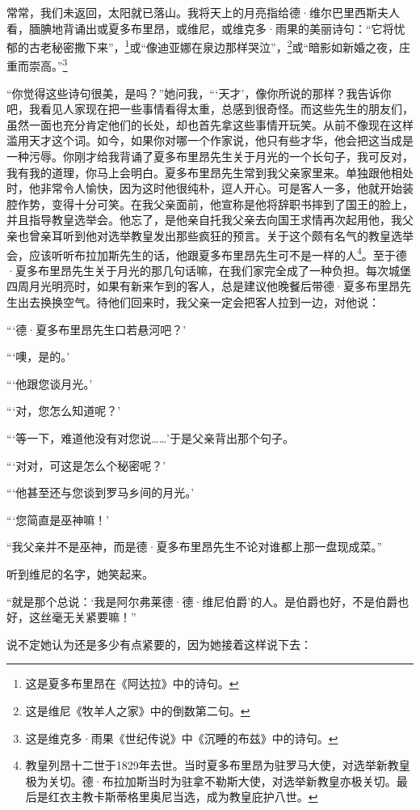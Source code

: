 \par 常常，我们未返回，太阳就已落山。我将天上的月亮指给德·维尔巴里西斯夫人看，腼腆地背诵出或夏多布里昂，或维尼，或维克多·雨果的美丽诗句：“它将忧郁的古老秘密撒下来”，\footnote{这是夏多布里昂在《阿达拉》中的诗句。}或“像迪亚娜在泉边那样哭泣”，\footnote{这是维尼《牧羊人之家》中的倒数第二句。}或“暗影如新婚之夜，庄重而崇高。”\footnote{这是维克多·雨果《世纪传说》中《沉睡的布兹》中的诗句。}
\par “你觉得这些诗句很美，是吗？”她问我，“‘天才’，像你所说的那样？我告诉你吧，我看见人家现在把一些事情看得太重，总感到很奇怪。而这些先生的朋友们，虽然一面也充分肯定他们的长处，却也首先拿这些事情开玩笑。从前不像现在这样滥用天才这个词。如今，如果你对哪一个作家说，他只有些才华，他会把这当成是一种污辱。你刚才给我背诵了夏多布里昂先生关于月光的一个长句子，我可反对，我有我的道理，你马上会明白。夏多布里昂先生常到我父亲家里来。单独跟他相处时，他非常令人愉快，因为这时他很纯朴，逗人开心。可是客人一多，他就开始装腔作势，变得十分可笑。在我父亲面前，他宣称是他将辞职书摔到了国王的脸上，并且指导教皇选举会。他忘了，是他亲自托我父亲去向国王求情再次起用他，我父亲也曾亲耳听到他对选举教皇发出那些疯狂的预言。关于这个颇有名气的教皇选举会，应该听听布拉加斯先生的话，他跟夏多布里昂先生可不是一样的人\footnote{教皇列昂十二世于1829年去世。当时夏多布里昂为驻罗马大使，对选举新教皇极为关切。德·布拉加斯当时为驻拿不勒斯大使，对选举新教皇亦极关切。最后是红衣主教卡斯蒂格里奥尼当选，成为教皇庇护八世。}。至于德·夏多布里昂先生关于月光的那几句话嘛，在我们家完全成了一种负担。每次城堡四周月光明亮时，如果有新来乍到的客人，总是建议他晚餐后带德·夏多布里昂先生出去换换空气。待他们回来时，我父亲一定会把客人拉到一边，对他说：
\par “‘德·夏多布里昂先生口若悬河吧？’
\par “‘噢，是的。’
\par “‘他跟您谈月光。’
\par “‘对，您怎么知道呢？’
\par “‘等一下，难道他没有对您说……’于是父亲背出那个句子。
\par “‘对对，可这是怎么个秘密呢？’
\par “‘他甚至还与您谈到罗马乡间的月光。’
\par “‘您简直是巫神嘛！’
\par “我父亲并不是巫神，而是德·夏多布里昂先生不论对谁都上那一盘现成菜。”
\par 听到维尼的名字，她笑起来。
\par “就是那个总说：‘我是阿尔弗莱德·德·维尼伯爵’的人。是伯爵也好，不是伯爵也好，这丝毫无关紧要嘛！”
\par 说不定她认为还是多少有点紧要的，因为她接着这样说下去：
